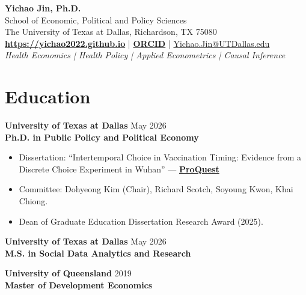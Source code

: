 \documentclass[11pt, letterpaper]{article}
\begin{document}
\thispagestyle{empty}
\pagestyle{empty}

\begin{center}
    {\huge \textbf{Yichao Jin, Ph.D.}} \\
    \vspace{0.5em}
    School of Economic, Political and Policy Sciences \\
    The University of Texas at Dallas, Richardson, TX 75080 \\
    \vspace{0.5em}
    \href{https://yichao2022.github.io}{\textbf{https://yichao2022.github.io}} \quad | \quad \href{https://orcid.org/0009-0003-7667-5143}{\textbf{ORCID}} \quad | \quad \href{mailto:Yichao.Jin@UTDallas.edu}{Yichao.Jin@UTDallas.edu} \\
    \vspace{0.5em}
    \textit{Health Economics \;|\; Health Policy \;|\; Applied Econometrics \;|\; Causal Inference}
\end{center}

\vspace{0.5em}
\noindent\hrulefill

\section*{Education}
\textbf{University of Texas at Dallas} \hfill May 2026 \\
\textbf{Ph.D. in Public Policy and Political Economy}
\begin{itemize}[noitemsep, topsep=0pt, label={-}]
    \item Dissertation: ``Intertemporal Choice in Vaccination Timing: Evidence from a Discrete Choice Experiment in Wuhan'' --- \href{https://www.proquest.com/docview/3354986484}{\textbf{ProQuest}}
    \item Committee: Dohyeong Kim (Chair), Richard Scotch, Soyoung Kwon, Khai Chiong.
    \item Dean of Graduate Education Dissertation Research Award (2025).
\end{itemize}

\vspace{0.5em}
\noindent \textbf{University of Texas at Dallas} \hfill May 2026 \\
\textbf{M.S. in Social Data Analytics and Research}

\vspace{0.5em}
\noindent \textbf{University of Queensland} \hfill 2019 \\
\textbf{Master of Development Economics}
\end{document}
